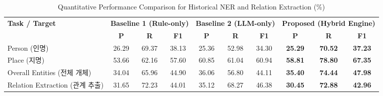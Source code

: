\begin{table}[htbp]
\centering
\caption{Quantitative Performance Comparison for Historical NER and Relation Extraction (\%)}
\label{tab:ner_performance}
\begin{tabular}{l|ccc|ccc|ccc}
\hline
\textbf{Task / Target} & \multicolumn{3}{c|}{\textbf{Baseline 1 (Rule-only)}} & \multicolumn{3}{c|}{\textbf{Baseline 2 (LLM-only)}} & \multicolumn{3}{c}{\textbf{Proposed (Hybrid Engine)}} \\
\cline{2-10}
 & \textbf{P} & \textbf{R} & \textbf{F1} & \textbf{P} & \textbf{R} & \textbf{F1} & \textbf{P} & \textbf{R} & \textbf{F1} \\
\hline
Person (인명) & 26.29 & 69.37 & 38.13 & 25.36 & 52.98 & 34.30 & \textbf{25.29} & \textbf{70.52} & \textbf{37.23} \\
Place (지명) & 53.66 & 62.16 & 57.60 & 60.85 & 61.04 & 60.94 & \textbf{58.81} & \textbf{78.80} & \textbf{67.35} \\
Overall Entities (전체 개체) & 34.04 & 65.96 & 44.90 & 36.06 & 56.80 & 44.11 & \textbf{35.40} & \textbf{74.44} & \textbf{47.98} \\
Relation Extraction (관계 추출) & 31.65 & 72.23 & 44.01 & 35.12 & 68.27 & 46.38 & \textbf{30.45} & \textbf{72.88} & \textbf{42.96} \\
\hline
\end{tabular}
\end{table}
